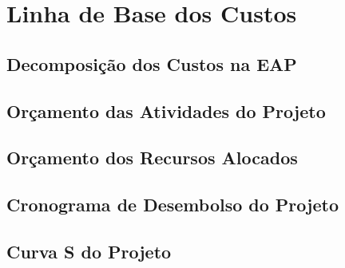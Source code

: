 \chapter{Linha de Base dos Custos}
\label{ch:cost-baseline}


\section{Decomposição dos Custos na EAP}

\section{Orçamento das Atividades do Projeto}

\section{Orçamento dos Recursos Alocados}

\section{Cronograma de Desembolso do Projeto}

\section{Curva S do Projeto}